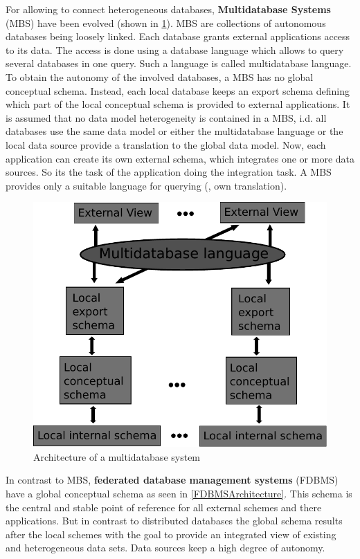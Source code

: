 For allowing to connect heterogeneous databases, \textbf{Multidatabase Systems} (MBS) have been evolved (shown in \ref{MBSDatabaseArchitecture}). MBS are collections of autonomous databases being loosely linked. Each database grants external applications access to its data. The access is done using a database language which allows to query several databases in one query. Such a language is called multidatabase language. To obtain the autonomy  of the involved databases, a MBS has no global conceptual schema. Instead, each local database keeps an export schema defining which part of the local conceptual schema is provided to external applications.  
It is assumed that no data model heterogeneity is contained in a MBS, i.d. all databases use the same data model or either the multidatabase language or the local data source provide a translation to the global data model. Now, each application can create its own external schema, which integrates one or more data sources. So its the task of the application doing the integration task. A MBS provides only a suitable language for querying (\cite[p. 93/94]{DBLP:books/dp/LeserN2006}, own translation).	
\begin{figure}[H]
	\begin{center}
		\includegraphics[scale=0.5]{figures/MultidatabaseArchitecture.pdf}
	\end{center}
	\caption{Architecture of a  multidatabase system}
	\label{MBSDatabaseArchitecture}
\end{figure}
In contrast to MBS, \textbf{federated database management systems} (FDBMS) have a global conceptual schema as seen in \ref{FDBMSArchitecture}. This schema is the central and stable point of reference for all external schemes and there applications. But in contrast to distributed databases the global schema results after the local schemes with the goal to provide an integrated view of existing and heterogeneous data sets. Data sources keep a high degree of autonomy.
